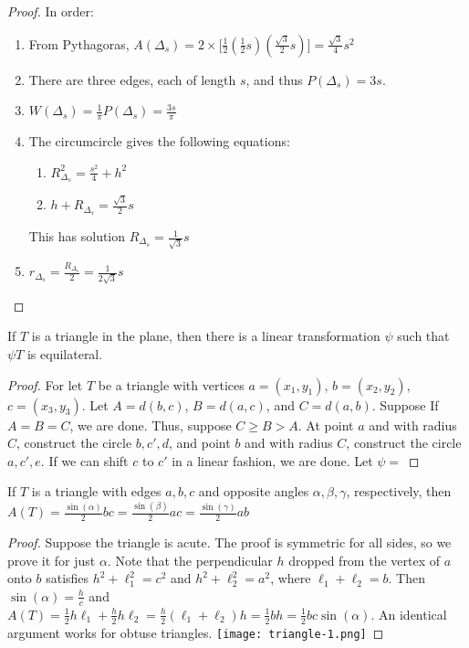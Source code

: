 \documentclass[crop=false,class=article,oneside]{standalone}
\begin{document}
        \begin{proof}
        In order:
        \begin{enumerate}
            \item From Pythagoras, $A(\Delta_s) =2\times\big[\frac{1}{2}(\frac{1}{2}s)(\frac{\sqrt{3}}{2}s)\big] = \frac{\sqrt{3}}{4}s^2$
            \item There are three edges, each of length $s$, and thus $P(\Delta_s) = 3s$.
            \item $W(\Delta_s) = \frac{1}{\pi}P(\Delta_s) = \frac{3s}{\pi}$
            \item The circumcircle gives the following equations:
            \begin{enumerate}
                \item $R_{\Delta_s}^2=\frac{s^2}{4}+h^2$
                \item $h+R_{\Delta_s} = \frac{\sqrt{3}}{2}s$
            \end{enumerate}
            This has solution $R_{\Delta_s}=\frac{1}{\sqrt{3}}s$
            \item $r_{\Delta_s} = \frac{R_{\Delta_s}}{2}= \frac{1}{2\sqrt{3}}s$
        \end{enumerate}
        \end{proof}
        \begin{theorem}
        If $T$ is a triangle in the plane, then there is a linear transformation $\psi$ such that $\psi T$ is equilateral.
        \end{theorem}
        \begin{proof}
        For let $T$ be a triangle with vertices $a=(x_1,y_1)$, $b=(x_2,y_2)$, $c=(x_3,y_3)$. Let $A = d(b,c)$, $B=d(a,c)$, and $C=d(a,b)$. Suppose If $A=B=C$, we are done. Thus, suppose $C\geq B >A$. At point $a$ and with radius $C$, construct the circle $b,c',d$, and point $b$ and with radius $C$, construct the circle $a,c',e$. If we can shift $c$ to $c'$ in a linear fashion, we are done. Let $\psi =$
        \end{proof}
        \begin{theorem}
        If $T$ is a triangle with edges $a,b,c$ and opposite angles $\alpha,\beta,\gamma$, respectively, then $A(T) = \frac{\sin(\alpha)}{2}bc = \frac{\sin(\beta)}{2}ac = \frac{\sin(\gamma)}{2}ab$
        \end{theorem}
        \begin{proof}
        Suppose the triangle is acute. The proof is symmetric for all sides, so we prove it for just $\alpha$. Note that the perpendicular $h$ dropped from the vertex of $a$ onto $b$ satisfies $h^2+\ell_1^2 = c^2$ and $h^2+\ell_2^2 = a^2$, where $\ell_1+\ell_2 = b$. Then $\sin(\alpha) = \frac{h}{c}$ and $A(T) = \frac{1}{2}h\ell_1 + \frac{h}{2}h\ell_2 = \frac{h}{2}(\ell_1+\ell_2)h = \frac{1}{2}bh = \frac{1}{2}bc\sin(\alpha)$. An identical argument works for obtuse triangles.
        \texttt{[image: triangle-1.png]}
        \end{proof}
\end{document}
